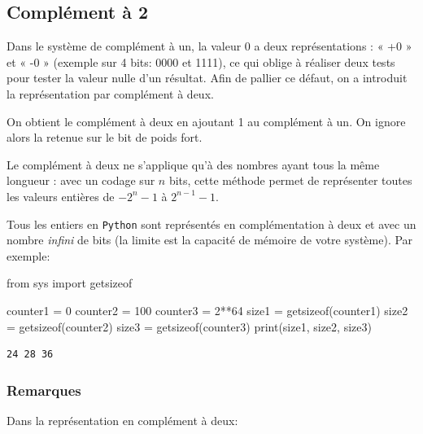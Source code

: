 \documentclass[
  letterpaper,
]{scrbook}
\newenvironment{Shaded}{}{}
\newcommand{\BuiltInTok}[1]{#1}
\newcommand{\DecValTok}[1]{\textcolor[rgb]{0.25,0.63,0.44}{#1}}
\newcommand{\ImportTok}[1]{#1}
\newcommand{\NormalTok}[1]{#1}
\newcommand{\OperatorTok}[1]{\textcolor[rgb]{0.40,0.40,0.40}{#1}}
\theoremstyle{definition}
\theoremstyle{definition}
\theoremstyle{plain}
\theoremstyle{remark}
\begin{document}
\hypertarget{compluxe9ment-uxe0-2}{%
\subsection{Complément à 2}\label{compluxe9ment-uxe0-2}}

Dans le système de complément à un, la valeur 0 a deux représentations :
« +0 » et « -0 » (exemple sur 4 bits: 0000 et 1111), ce qui oblige à
réaliser deux tests pour tester la valeur nulle d'un résultat. Afin de
pallier ce défaut, on a introduit la représentation par complément à
deux.

On obtient le complément à deux en ajoutant 1 au complément à un. On
ignore alors la retenue sur le bit de poids fort.

Le complément à deux ne s'applique qu'à des nombres ayant tous la même
longueur : avec un codage sur \(n\) bits, cette méthode permet de
représenter toutes les valeurs entières de \(−2^n − 1\) à
\(2^{n − 1} − 1\).

Tous les entiers en \texttt{Python} sont représentés en complémentation
à deux et avec un nombre \emph{infini} de bits (la limite est la
capacité de mémoire de votre système). Par exemple:

\begin{Shaded}
\begin{Highlighting}[]
\ImportTok{from}\NormalTok{ sys }\ImportTok{import}\NormalTok{ getsizeof}

\NormalTok{counter1 }\OperatorTok{=} \DecValTok{0}
\NormalTok{counter2 }\OperatorTok{=} \DecValTok{100}
\NormalTok{counter3 }\OperatorTok{=} \DecValTok{2}\OperatorTok{**}\DecValTok{64}
\NormalTok{size1 }\OperatorTok{=}\NormalTok{ getsizeof(counter1)}
\NormalTok{size2 }\OperatorTok{=}\NormalTok{ getsizeof(counter2)}
\NormalTok{size3 }\OperatorTok{=}\NormalTok{ getsizeof(counter3)}
\BuiltInTok{print}\NormalTok{(size1, size2, size3)}
\end{Highlighting}
\end{Shaded}

\begin{verbatim}
24 28 36
\end{verbatim}

\hypertarget{remarques}{%
\subsubsection*{Remarques}\label{remarques}}

Dans la représentation en complément à deux:
\end{document}
